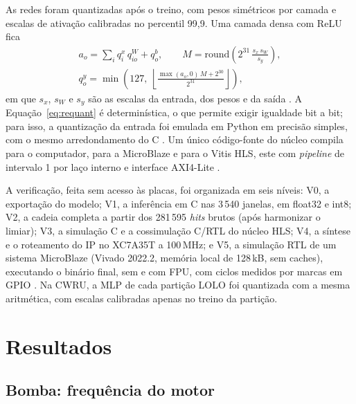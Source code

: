 \documentclass[12pt]{article}
\begin{document}
As redes foram quantizadas após o treino, com pesos simétricos por camada e escalas de ativação calibradas no percentil 99,9. Uma camada densa com ReLU fica
\begin{equation}
	\begin{gathered}
	a_o = \sum_{i} q^{x}_{i}\, q^{W}_{io} + q^{b}_{o}, \qquad
	M = \mathrm{round}\!\left(2^{31}\,\frac{s_x\, s_W}{s_y}\right), \\
	q^{y}_{o} = \min\!\left(127,\ \left\lfloor \frac{\max(a_o, 0)\, M + 2^{30}}{2^{31}} \right\rfloor\right),
	\end{gathered}
	\label{eq:requant}
\end{equation}
em que \(s_x\), \(s_W\) e \(s_y\) são as escalas da entrada, dos pesos e da saída \cite{jacob2018,krishnamoorthi2018}. A Equação~\eqref{eq:requant} é determinística, o que permite exigir igualdade bit a bit; para isso, a quantização da entrada foi emulada em Python em precisão simples, com o mesmo arredondamento do C \cite{goldberg1991,ieee754}. Um único código-fonte do núcleo compila para o computador, para a MicroBlaze e para o Vitis HLS, este com \textit{pipeline} de intervalo 1 por laço interno e interface AXI4-Lite \cite{amd_ug1399}.

A verificação, feita sem acesso às placas, foi organizada em seis níveis: V0, a exportação do modelo; V1, a inferência em C nas 3\,540 janelas, em float32 e int8; V2, a cadeia completa a partir dos 281\,595 \textit{hits} brutos (após harmonizar o limiar); V3, a simulação C e a cossimulação C/RTL do núcleo HLS; V4, a síntese e o roteamento do IP no XC7A35T a 100\,MHz; e V5, a simulação RTL de um sistema MicroBlaze (Vivado 2022.2, memória local de 128\,kB, sem caches), executando o binário final, sem e com FPU, com ciclos medidos por marcas em GPIO \cite{amd_ug900,amd_ug984}. Na CWRU, a MLP de cada partição LOLO foi quantizada com a mesma aritmética, com escalas calibradas apenas no treino da partição.

\section{Resultados}
\label{sec:resultados}

\subsection{Bomba: frequência do motor}
\label{subsec:res_freq}
\end{document}
